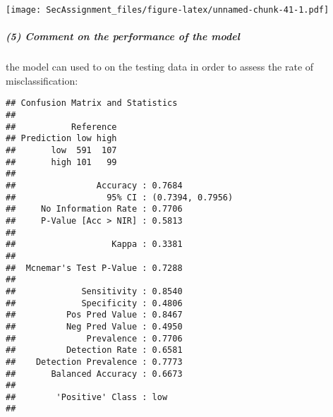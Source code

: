 \documentclass[12pt]{article}
\newenvironment{Shaded}{\begin{snugshade}}{\end{snugshade}}
\newcommand{\CommentTok}[1]{\textcolor[rgb]{0.56,0.35,0.01}{\textit{#1}}}
\newcommand{\DataTypeTok}[1]{\textcolor[rgb]{0.13,0.29,0.53}{#1}}
\newcommand{\KeywordTok}[1]{\textcolor[rgb]{0.13,0.29,0.53}{\textbf{#1}}}
\newcommand{\NormalTok}[1]{#1}
\newcommand{\OperatorTok}[1]{\textcolor[rgb]{0.81,0.36,0.00}{\textbf{#1}}}
\newcommand{\StringTok}[1]{\textcolor[rgb]{0.31,0.60,0.02}{#1}}
\let\oldsubparagraph\subparagraph
\renewcommand{\subparagraph}[1]{\oldsubparagraph{#1}\mbox{}}
\begin{document}
\texttt{[image: SecAssignment\_files/figure-latex/unnamed-chunk-41-1.pdf]}

\hypertarget{comment-on-the-performance-of-the-model}{%
\subparagraph{(5) Comment on the performance of the
model}\label{comment-on-the-performance-of-the-model}}

the model can used to on the testing data in order to assess the rate of
misclassification:

\begin{Shaded}
\end{Shaded}

\begin{verbatim}
## Confusion Matrix and Statistics
## 
##           Reference
## Prediction low high
##       low  591  107
##       high 101   99
##                                           
##                Accuracy : 0.7684          
##                  95% CI : (0.7394, 0.7956)
##     No Information Rate : 0.7706          
##     P-Value [Acc > NIR] : 0.5813          
##                                           
##                   Kappa : 0.3381          
##                                           
##  Mcnemar's Test P-Value : 0.7288          
##                                           
##             Sensitivity : 0.8540          
##             Specificity : 0.4806          
##          Pos Pred Value : 0.8467          
##          Neg Pred Value : 0.4950          
##              Prevalence : 0.7706          
##          Detection Rate : 0.6581          
##    Detection Prevalence : 0.7773          
##       Balanced Accuracy : 0.6673          
##                                           
##        'Positive' Class : low             
## 
\end{verbatim}
\end{document}

